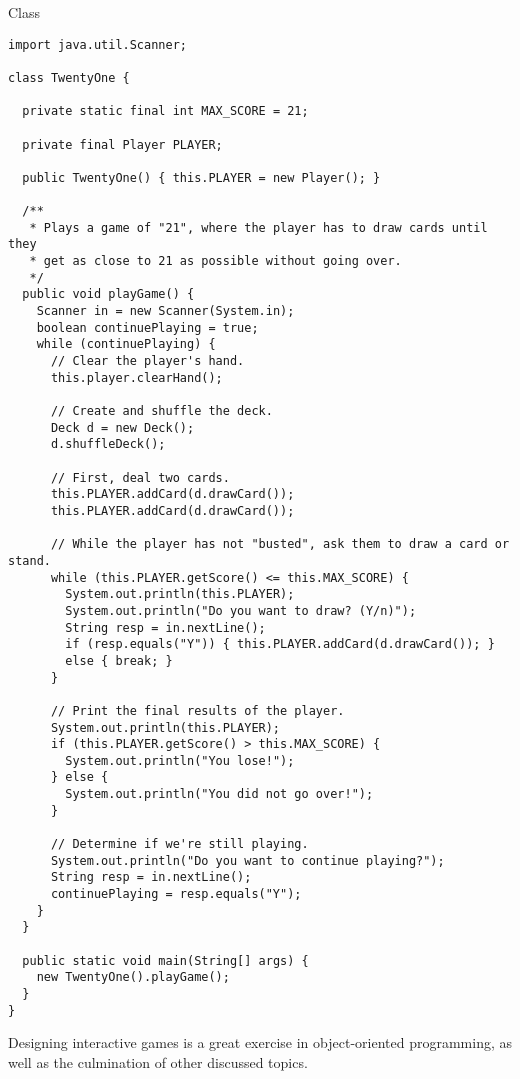 \begin{cl}[]{ Class}
\begin{lstlisting}[language=MyJava]
import java.util.Scanner;

class TwentyOne {

  private static final int MAX_SCORE = 21;

  private final Player PLAYER;

  public TwentyOne() { this.PLAYER = new Player(); }

  /**
   * Plays a game of "21", where the player has to draw cards until they
   * get as close to 21 as possible without going over.
   */
  public void playGame() {
    Scanner in = new Scanner(System.in);
    boolean continuePlaying = true;
    while (continuePlaying) {
      // Clear the player's hand.
      this.player.clearHand();

      // Create and shuffle the deck.
      Deck d = new Deck();
      d.shuffleDeck();

      // First, deal two cards.
      this.PLAYER.addCard(d.drawCard());
      this.PLAYER.addCard(d.drawCard());

      // While the player has not "busted", ask them to draw a card or stand.
      while (this.PLAYER.getScore() <= this.MAX_SCORE) {
        System.out.println(this.PLAYER);
        System.out.println("Do you want to draw? (Y/n)");
        String resp = in.nextLine();
        if (resp.equals("Y")) { this.PLAYER.addCard(d.drawCard()); }
        else { break; }
      }

      // Print the final results of the player.
      System.out.println(this.PLAYER);
      if (this.PLAYER.getScore() > this.MAX_SCORE) {
        System.out.println("You lose!");
      } else {
        System.out.println("You did not go over!");
      }

      // Determine if we're still playing.
      System.out.println("Do you want to continue playing?");
      String resp = in.nextLine();
      continuePlaying = resp.equals("Y");
    }
  }

  public static void main(String[] args) {
    new TwentyOne().playGame();
  }
}
\end{lstlisting}
\end{cl}

Designing interactive games is a great exercise in object-oriented programming, as well as the culmination of other discussed topics.


